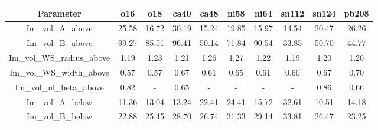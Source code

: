 \begin{tabular}{|c||c||c||c||c||c||c||c||c||c|} 
 \hline 
\bf{Parameter}& \bf{o16}& \bf{o18}& \bf{ca40}& \bf{ca48}& \bf{ni58}& \bf{ni64}& \bf{sn112}& \bf{sn124}& \bf{pb208}\\
 \hline
 \hline 
Im\_vol\_A\_above & 25.58 & 16.72 & 30.19 & 15.24 & 19.85 & 15.97 & 14.54 & 20.47 & 26.26\\
Im\_vol\_B\_above & 99.27 & 85.51 & 96.41 & 50.14 & 71.84 & 90.54 & 33.85 & 50.70 & 44.77\\
Im\_vol\_WS\_radius\_above & 1.19 & 1.23 & 1.21 & 1.26 & 1.27 & 1.22 & 1.19 & 1.20 & 1.20\\
Im\_vol\_WS\_width\_above & 0.57 & 0.57 & 0.67 & 0.61 & 0.65 & 0.61 & 0.60 & 0.67 & 0.70\\
Im\_vol\_nl\_beta\_above & 0.82 & - & 0.65 & - & - & - & - & 0.86 & 0.66\\
Im\_vol\_A\_below & 11.36 & 13.04 & 13.24 & 22.41 & 24.41 & 15.72 & 32.61 & 10.51 & 14.18\\
Im\_vol\_B\_below & 22.88 & 25.45 & 28.70 & 26.74 & 31.33 & 29.14 & 33.81 & 26.47 & 23.25\\

 \hline 
\end{tabular}